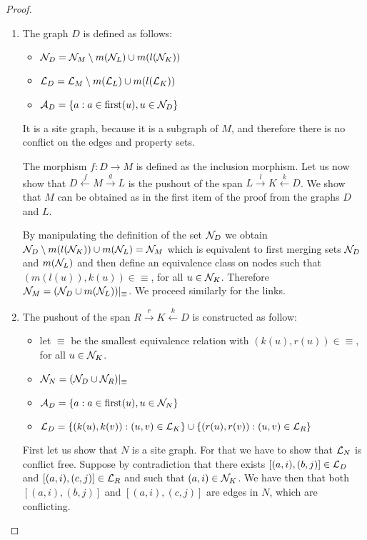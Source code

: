 \begin{proof}
\begin{enumerate}
  \item The graph $D$ is defined as follows:
    \begin{itemize}
    \item $\mathcal{N}_D = \mathcal{N}_M\setminus m(\mathcal{N}_L) \cup m(l(\mathcal{N}_K))$
    \item $\mathcal{L}_D = \mathcal{L}_M\setminus m(\mathcal{L}_L) \cup m(l(\mathcal{L}_K))$
    \item $\mathcal{A}_D = \{a: a\in \text{first}(u), u\in\mathcal{N}_D\}$
    \end{itemize}
    It is a site graph, because it is a subgraph of $M$, and therefore there is no conflict on the edges and property sets.

    The morphism $f:D\to M$ is defined as the inclusion morphism.
    Let us now show that $D\overset{f}{\leftarrow}M\overset{g}{\rightarrow} L$ is the pushout of the span $L\overset{l}{\rightarrow}K\overset{k}{\leftarrow} D$. We show that $M$ can be obtained as in the first item of the proof from the graphs $D$ and $L$.

    By manipulating the definition of the set $\mathcal{N}_D$ we obtain $\mathcal{N}_D\setminus m(l(\mathcal{N}_K))\cup m(\mathcal{N}_L) = \mathcal{N}_M$ which is equivalent to first merging sets $\mathcal{N}_D$ and $m(\mathcal{N}_L)$ and then define an equivalence class on nodes such that $(m(l(u)),k(u))\in\equiv$, for all $u\in\mathcal{N}_K$. Therefore $\mathcal{N}_M = (\mathcal{N}_D\cup m(\mathcal{N}_L))|_{\equiv}$. We proceed similarly for the links. %

  \item The pushout of the span $R\overset{r}{\rightarrow}K\overset{k}{\leftarrow} D$  is constructed as follow:
    \begin{itemize}
    \item let $\equiv$ be the smallest equivalence relation with $(k(u),r(u))\in\equiv$, for all $u\in\mathcal{N}_K$.
    \item $\mathcal{N}_N = (\mathcal{N}_D\cup \mathcal{N}_R)|_{\equiv}$
    \item $\mathcal{A}_D = \{a: a\in \text{first}(u), u\in\mathcal{N}_N\}$
    \item $\mathcal{L}_D = \{(k(u),k(v)) : (u,v)\in\mathcal{L}_K\}\cup\{(r(u),r(v)) : (u,v)\in\mathcal{L}_R\}$
    \end{itemize}
    First let us show that $N$ is a site graph. For that we have to show that $\mathcal{L}_N$ is conflict free. Suppose by contradiction that there exists $[(a,i),(b,j)]\in \mathcal{L}_D$ and $[(a,i),(c,j)]\in \mathcal{L}_R$ and such that $(a,i)\in\mathcal{N}_K$. We have then that both $[(a,i),(b,j)]$ and $[(a,i),(c,j)]$ are edges in $N$, which are conflicting.


\end{enumerate}
\end{proof}
